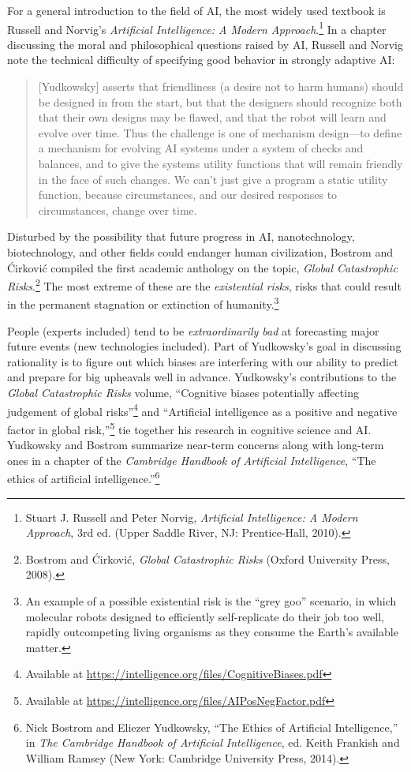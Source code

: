 {
 For a general introduction to the field of AI, the most widely
used textbook is Russell and Norvig's
\textit{Artificial Intelligence: A Modern Approach}.\footnote{Stuart J. Russell and Peter Norvig, \textit{Artificial
Intelligence: A Modern Approach}, 3rd ed. (Upper Saddle River, NJ:
Prentice-Hall, 2010).}
In a chapter discussing the moral and philosophical questions raised by
AI, Russell and Norvig note the technical difficulty of specifying good
behavior in strongly adaptive AI:}

\begin{quotation}
{
 [Yudkowsky] asserts that friendliness (a desire not to harm
humans) should be designed in from the start, but that the designers
should recognize both that their own designs may be flawed, and that
the robot will learn and evolve over time. Thus the challenge is one of
mechanism design---to define a mechanism for evolving AI systems under
a system of checks and balances, and to give the systems utility
functions that will remain friendly in the face of such changes. We
can't just give a program a static utility function,
because circumstances, and our desired responses to circumstances,
change over time.}
\end{quotation}

{
 Disturbed by the possibility that future progress in AI,
nanotechnology, biotechnology, and other fields could endanger human
civilization, Bostrom and \'Cirkovi\'c compiled the first academic
anthology on the topic, \textit{Global Catastrophic
Risks}.\footnote{Bostrom and \'Cirkovi\'c, \textit{Global Catastrophic Risks} (Oxford University Press, 2008).} The most extreme of these are the
\textit{existential risks}, risks that could result in the permanent
stagnation or extinction of humanity.\footnote{An example of a possible existential risk is the
``grey goo'' scenario, in which
molecular robots designed to efficiently self-replicate do their job
too well, rapidly outcompeting living organisms as they consume the
Earth's available matter.}}

{
 People (experts included) tend to be \textit{extraordinarily bad}
at forecasting major future events (new technologies included). Part of
Yudkowsky's goal in discussing rationality is to figure
out which biases are interfering with our ability to predict and
prepare for big upheavals well in advance. Yudkowsky's
contributions to the \textit{Global Catastrophic Risks} volume,
``Cognitive biases potentially affecting judgement of
global risks''\footnote{Available at \url{https://intelligence.org/files/CognitiveBiases.pdf}} and ``Artificial
intelligence as a positive and negative factor in global
risk,''\footnote{Available at \url{https://intelligence.org/files/AIPosNegFactor.pdf}} tie together his research in cognitive
science and AI. Yudkowsky and Bostrom summarize near-term concerns
along with long-term ones in a chapter of the \textit{Cambridge
Handbook of Artificial Intelligence}, ``The ethics of
artificial intelligence.''\footnote{Nick Bostrom and Eliezer Yudkowsky, ``The
Ethics of Artificial Intelligence,'' in \textit{The
Cambridge Handbook of Artificial Intelligence}, ed. Keith Frankish and
William Ramsey (New York: Cambridge University Press, 2014).}}


